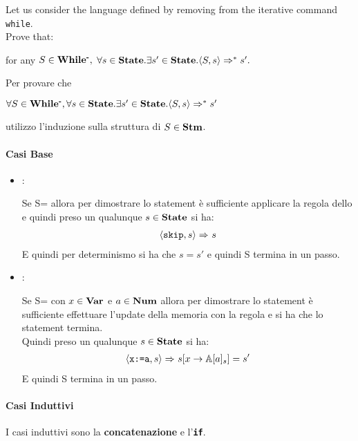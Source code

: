 \newcommand{\whilem}{\syntacticCategory{While\textsuperscript{-}}}
\newcommand{\exOne}{$\forall{}S\in\whilem,\forall{}s\in\states.\exists s'\in\states.\confSs{S}{s}\Rar{*}s'$}

{
	Let us consider the language \whilem{} defined by removing from \while{}
	the iterative command \texttt{while}.  \\
	Prove that: 
	\begin{center}
	for any 
	$S\in\whilem,$
	$ \forall{}s\in\mbox{\textbf{State}}.\exists s'\in\mbox{\textbf{State}}.\langle{}S, s\rangle{}\Rightarrow^{*}s'. $
	\end{center}
}

{
	Per provare che
	\begin{center}
		\exOne{} 
	\end{center} 
	utilizzo l'induzione sulla struttura di $S\in\mbox{\textbf{Stm}}$.
	
\paragraph{Casi Base} 
	\begin{itemize}
	
	\item {}: 
	\casespace{}
	
	Se S=\skipistr{} allora per dimostrare lo
	statement è sufficiente applicare la regola dello \skipSOS{} e quindi preso
	un qualunque $s\in\mbox{\textbf{State}}$ si ha:
	\begin{align*}
	\langle{}\textrm{\normalfont{\texttt{skip}}}, s\rangle{}\Rightarrow^{}s
	\end{align*}
	E quindi per determinismo si ha che $s=s'$ e quindi S termina in un passo.
	\postcasespace{}

	\item {}: 
	
	\casespace{}
	
	Se S= con $x\in\mbox{\textbf{Var}}$
	e $a\in\mbox{\textbf{Num}}$ allora per dimostrare lo statement è sufficiente effettuare
	l'update della memoria con la regola \assSOS{} e si ha che lo statement
	termina.
	\\
	Quindi preso un
	qualunque $s\in\mbox{\textbf{State}}$ si ha:
	\begin{align*}
	\langle{}\textrm{\normalfont{\texttt{x:=a}}}, s\rangle{}\Rightarrow^{}s[x\rightarrow{}\mathbb{A}[a]_s]=s'
	\end{align*}
	E quindi S termina in un passo.
	\postcasespace
	\end{itemize}

\paragraph{Casi Induttivi} 	
I casi induttivi sono la \textbf{concatenazione} e l'\textbf{\texttt{if}}. 
	\begin{itemize}


\end{itemize}}
